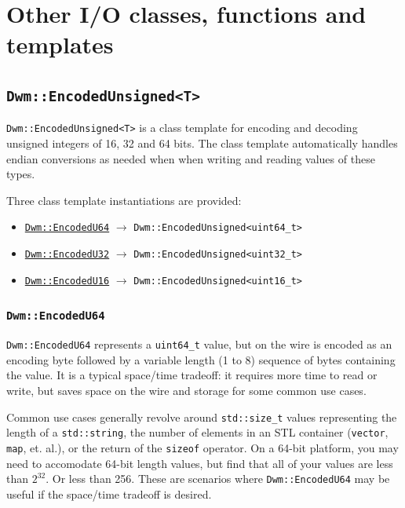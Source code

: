 \chapter{Other I/O classes, functions and templates}

\section{\texttt{Dwm::EncodedUnsigned<T>}}\label{classtmpl:EncodedUnsigned}
\begin{minipage}{\linewidth}
\texttt{Dwm::EncodedUnsigned<T>} is a class template for encoding
and decoding unsigned integers of 16, 32 and 64 bits.  The class
template automatically handles endian conversions as needed when
when writing and reading values of these types.
\vspace{1ex}

Three class template instantiations are provided:
\vspace{1ex}

\begin{itemize}[noitemsep,nolistsep]
\item[] \hyperref[class:EncodedU64]{\texttt{Dwm::EncodedU64}} $\rightarrow$ \texttt{Dwm::EncodedUnsigned<uint64\_t>}
\item[] \hyperref[class:EncodedU32]{\texttt{Dwm::EncodedU32}} $\rightarrow$ \texttt{Dwm::EncodedUnsigned<uint32\_t>}
\item[] \hyperref[class:EncodedU16]{\texttt{Dwm::EncodedU16}} $\rightarrow$ \texttt{Dwm::EncodedUnsigned<uint16\_t>}
\end{itemize}
\end{minipage}

\subsection{\texttt{Dwm::EncodedU64}}\label{class:EncodedU64}
\texttt{Dwm::EncodedU64} represents a \texttt{uint64\_t} value, but
on the wire is encoded as an encoding byte followed by a variable
length (1 to 8) sequence of bytes containing the value.  It is a
typical space/time tradeoff: it requires more time to read or write,
but saves space on the wire and storage for some common use cases.

Common use cases generally revolve around \texttt{std::size\_t} values
representing the length of a \texttt{std::string}, the number of elements
in an STL container (\texttt{vector}, \texttt{map}, et. al.), or the
return of the \texttt{sizeof} operator.  On a 64-bit platform, you may
need to accomodate 64-bit length values, but find that all of your values
are less than $2^{32}$.  Or less than 256.  These are scenarios where
\texttt{Dwm::EncodedU64} may be useful if the space/time tradeoff is
desired.

